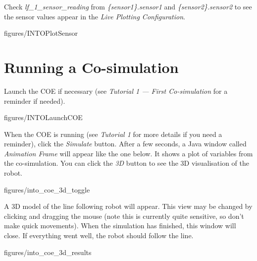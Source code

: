 \documentclass[11pt,a4paper]{../tutorial}
\begin{document}
\begin{instructions}
\item Check \emph{lf\_1\_sensor\_reading} from \emph{\{sensor1\}.sensor1} and \emph{\{sensor2\}.sensor2} to see the sensor values appear in the \emph{Live Plotting Configuration}.

    \begin{annotation}[width=0.85\linewidth,trim=0 230 0 250,clip]{figures/INTOPlotSensor}
    \end{annotation}

\end{instructions}

\section{Running a Co-simulation}

\begin{instructions}

\item Launch the COE if necessary (see \emph{Tutorial 1 --- First Co-simulation} for a reminder if needed).

    \begin{annotation}[width=0.85\linewidth,trim=0 270 0 120,clip]{figures/INTOLaunchCOE}
    \end{annotation}

\item When the COE is running (see \emph{Tutorial 1} for more details if you need a reminder), click the \emph{Simulate} button. After a few seconds, a Java window called \emph{Animation Frame} will appear like the one below. It shows a plot of variables from the co-simulation. You can click the \emph{3D} button to see the 3D visualisation of the robot.

    \begin{annotation}[width=0.5\linewidth,trim=0 0 0 0,clip]{figures/into_coe_3d_toggle}
    \end{annotation}

\item  A 3D model of the line following robot will appear. This view may be changed by clicking and dragging the mouse (note this is currently quite sensitive, so don’t make quick movements). When the simulation has finished, this window will close. If everything went well, the robot should follow the line.

    \begin{annotation}[width=0.5\linewidth,trim=0 300 0 0,clip]{figures/into_coe_3d_results}
    \end{annotation}

\end{instructions}
\end{document}
